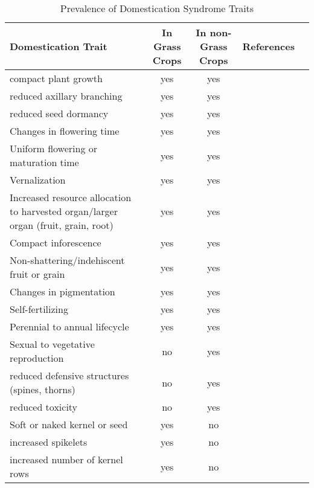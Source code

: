 \documentclass[12pt]{article}
\begin{document}
\begin{table}
\begin{center}
\caption{Prevalence of Domestication Syndrome Traits} \label{tab:DomTraits}
\begin{tabular}{p{5cm}cccl}\\\toprule  
{\bf Domestication Trait} & {\bf In Grass Crops} & {\bf In non-Grass Crops} &	{\bf References} \\\toprule
compact plant growth & yes & yes & \citep{Doebley2006}\\
reduced axillary branching & yes & yes & \citep{Doebley2006}\\
reduced seed dormancy & yes & yes & \citep{Doebley2006}\\
Changes in flowering time & yes & yes & \citep{Doebley2006}\\
Uniform flowering or maturation time & yes & yes & \citep{Doebley2006}\\
Vernalization & yes & yes & \citep{Doebley2006}\\
Increased resource allocation to harvested organ/larger organ (fruit, grain, root) & yes & yes & \citep{Doebley2006}\\
Compact inforescence & yes & yes & \citep{Doebley2006}\\
Non-shattering/indehiscent fruit or grain & yes & yes & \citep{Doebley2006}\\
Changes in pigmentation & yes & yes & \citep{Doebley2006}\\
Self-fertilizing & yes & yes & \citep{Doebley2006}\\
Perennial to annual lifecycle  & yes & yes & \citep{Doebley2006}\\
Sexual to vegetative reproduction & no & yes & \citep{Doebley2006}\\
reduced defensive structures (spines, thorns) & no & yes & \citep{Doebley2006}\\
reduced toxicity & no & yes & \citep{Doebley2006}\\
Soft or naked kernel or seed & yes & no & \citep{Doebley2006}\\
increased spikelets & yes & no & \citep{Doebley2006}\\
increased number of kernel rows & yes & no & \citep{Doebley2006}\\\bottomrule
\end{tabular}
\end{center}
\end{table} 
 
\end{document}
